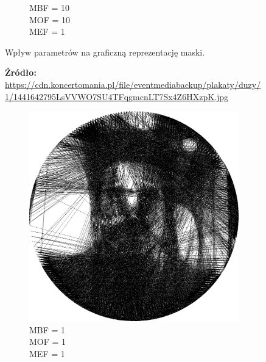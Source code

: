 \begin{figure}[htb]
\begin{subfigure}{0.32\textwidth}
        \caption{MBF = 10 \\ MOF = 10 \\ MEF = 1}
        \label{mine-param-taco-i}
    \end{subfigure}
    \caption{Wpływ parametrów na graficzną reprezentację maski.}
    \caption*{\footnotesize{\textbf{Źródło:} {\url{https://cdn.koncertomania.pl/file/eventmediabackup/plakaty/duzy/1/1441642795LsVVWO7SU4TFqgmcnLT7Sx4Z6HXzpK.jpg}}}}
    \label{mine-param-taco}
    \end{figure}
    
    
    \begin{figure}[htb] 
    \centering
    \begin{subfigure}{0.24\textwidth}
        \centering
        \includegraphics[width = \textwidth]{img/4-mine/taco-thread/taco_e_i3000_c20_inv0_bg1_obj1_ed1.png}
        \caption{MBF = 1 \\ MOF = 1 \\ MEF = 1}
        \label{mine-param-taco-thread-b}
    \end{subfigure}
    \begin{subfigure}{0.24\textwidth}
        \centering

\end{subfigure}
\end{figure}
